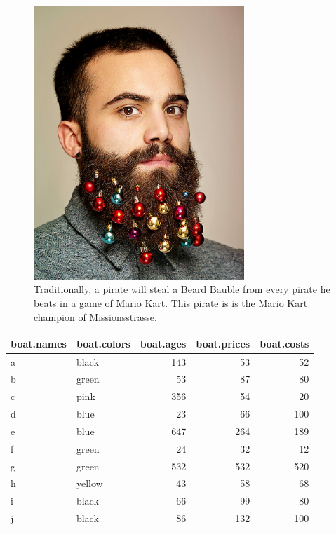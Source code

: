 \documentclass[]{book}
\theoremstyle{definition}
\theoremstyle{definition}
\theoremstyle{remark}
\begin{document}
\begin{figure}

{\centering \includegraphics[width=300px]{images/beard} 

}

\caption{Traditionally, a pirate will steal a Beard Bauble from every pirate he beats in a game of Mario Kart. This pirate is is the Mario Kart champion of Missionsstrasse.}\label{fig:unnamed-chunk-129}
\end{figure}

\begin{tabular}{l|l|r|r|r}
\hline
boat.names & boat.colors & boat.ages & boat.prices & boat.costs\\
\hline
a & black & 143 & 53 & 52\\
\hline
b & green & 53 & 87 & 80\\
\hline
c & pink & 356 & 54 & 20\\
\hline
d & blue & 23 & 66 & 100\\
\hline
e & blue & 647 & 264 & 189\\
\hline
f & green & 24 & 32 & 12\\
\hline
g & green & 532 & 532 & 520\\
\hline
h & yellow & 43 & 58 & 68\\
\hline
i & black & 66 & 99 & 80\\
\hline
j & black & 86 & 132 & 100\\
\hline
\end{tabular}
\end{document}
